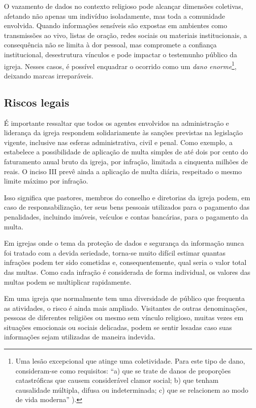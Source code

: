 O vazamento de dados no contexto religioso pode alcançar dimensões coletivas, afetando não apenas um indivíduo isoladamente, mas toda a comunidade envolvida. Quando informações sensíveis são expostas em ambientes como transmissões ao vivo, listas de oração, redes sociais ou materiais institucionais, a consequência não se limita à dor pessoal, mas compromete a confiança institucional, desestrutura vínculos e pode impactar o testemunho público da igreja. Nesses casos, é possível enquadrar o ocorrido como um \textit{dano enorme}\footnote{Uma lesão excepcional que atinge uma coletividade. Para este tipo de dano, consideram-se como requisitos: ``a) que se trate de danos de proporções catastróficas que causem considerável clamor social; b) que tenham causalidade múltipla, difusa ou indeterminada; c) que se relacionem ao modo de vida moderna'' ).}, deixando marcas irreparáveis.

\subsection{Riscos legais}

É importante ressaltar que todos os agentes envolvidos na administração e liderança da igreja respondem solidariamente às sanções previstas na legislação vigente, inclusive nas esferas administrativa, civil e penal. Como exemplo, a  estabelece a possibilidade de aplicação de multa simples de até dois por cento do faturamento anual bruto da igreja, por infração, limitada a cinquenta milhões de reais. O inciso III prevê ainda a aplicação de multa diária, respeitado o mesmo limite máximo por infração.

Isso significa que pastores, membros do conselho e diretorias da igreja podem, em caso de responsabilização, ter seus bens pessoais utilizados para o pagamento das penalidades, incluindo imóveis, veículos e contas bancárias, para o pagamento da multa.

Em igrejas onde o tema da proteção de dados e segurança da informação nunca foi tratado com a devida seriedade, torna-se muito difícil estimar quantas infrações podem ter sido cometidas e, consequentemente, qual seria o valor total das multas. Como cada infração é considerada de forma individual, os valores das multas podem se multiplicar rapidamente.

Em uma igreja que normalmente tem uma diversidade de público que frequenta as atividades, o risco é ainda mais ampliado. Visitantes de outras denominações, pessoas de diferentes religiões ou mesmo sem vínculo religioso, muitas vezes em situações emocionais ou sociais delicadas, podem se sentir lesadas caso suas informações sejam utilizadas de maneira indevida.

